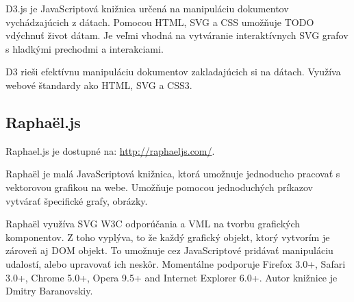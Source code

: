 D3.js je JavaScriptová knižnica určená na manipuláciu dokumentov vychádzajúcich z dátach. Pomocou \acs{HTML}, \acs{SVG} a \acs{CSS} umožňuje TODO vdýchnuť život dátam. 
Je veľmi vhodná na vytváranie interaktívnych SVG grafov s hladkými prechodmi a interakciami. 



D3 rieši efektívnu manipuláciu dokumentov zakladajúcich si na dátach. Využíva webové štandardy ako \acs{HTML}, \acs{SVG} a \acs{CSS}3. 


\subsection{Raphaël.js}
Raphael.js je dostupné na: \url{http://raphaeljs.com/}.

Raphaël je malá JavaScriptová knižnica, ktorá umožnuje jednoducho pracovať s vektorovou grafikou na webe. Umožňuje pomocou jednoduchých príkazov vytvárať špecifické grafy, obrázky. 

Raphaël využíva \acs{SVG} \acs{W3C} odporúčania a \acs{VML} na tvorbu grafických komponentov. Z toho vyplýva, to že každý grafický objekt, ktorý vytvorím je zároveň aj DOM objekt. To umožnuje cez JavaScriptové pridávať manipuláciu udalostí, alebo upravovať ich neskôr.
Momentálne podporuje Firefox 3.0+, Safari 3.0+, Chrome 5.0+, Opera 9.5+ and Internet Explorer 6.0+.
Autor knižnice je Dmitry Baranovskiy. 


